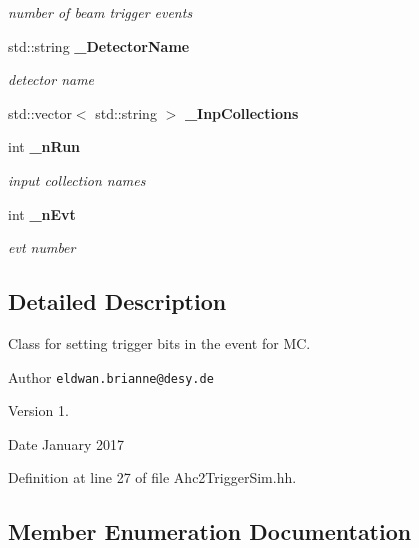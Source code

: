 \begin{DoxyCompactItemize}
\begin{DoxyCompactList}\small\item\em number of beam trigger events \end{DoxyCompactList}\item 
std\-::string {\bf \-\_\-\-Detector\-Name}\label{classCALICE_1_1Ahc2TriggerSim_a4832bbd1f850338fee65c2f03e2c189e}

\begin{DoxyCompactList}\small\item\em detector name \end{DoxyCompactList}\item 
std\-::vector$<$ std\-::string $>$ {\bfseries \-\_\-\-Inp\-Collections}\label{classCALICE_1_1Ahc2TriggerSim_ae77a7bf9820cbfe1034e3d1fa6c28631}

\item 
int {\bf \-\_\-n\-Run}
\begin{DoxyCompactList}\small\item\em input collection names \end{DoxyCompactList}\item 
int {\bf \-\_\-n\-Evt}\label{classCALICE_1_1Ahc2TriggerSim_ae33b2c3da2135fd22c96e837ec3d27f4}

\begin{DoxyCompactList}\small\item\em evt number \end{DoxyCompactList}\end{DoxyCompactItemize}


\subsection{Detailed Description}
Class for setting trigger bits in the event for M\-C. 

\begin{DoxyAuthor}{Author}
{\tt eldwan.\-brianne@desy.\-de} 
\end{DoxyAuthor}
\begin{DoxyVersion}{Version}
1. 
\end{DoxyVersion}
\begin{DoxyDate}{Date}
January 2017 
\end{DoxyDate}


Definition at line 27 of file Ahc2\-Trigger\-Sim.\-hh.



\subsection{Member Enumeration Documentation}
